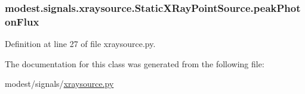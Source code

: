 \subsubsection[{\texorpdfstring{peak\+Photon\+Flux}{peakPhotonFlux}}]{\setlength{\rightskip}{0pt plus 5cm}modest.\+signals.\+xraysource.\+Static\+X\+Ray\+Point\+Source.\+peak\+Photon\+Flux}\hypertarget{classmodest_1_1signals_1_1xraysource_1_1StaticXRayPointSource_a45c2430decc163480da7732af27d1f99}{}\label{classmodest_1_1signals_1_1xraysource_1_1StaticXRayPointSource_a45c2430decc163480da7732af27d1f99}


Definition at line 27 of file xraysource.\+py.



The documentation for this class was generated from the following file\+:\begin{DoxyCompactItemize}
\item 
modest/signals/\hyperlink{xraysource_8py}{xraysource.\+py}\end{DoxyCompactItemize}
